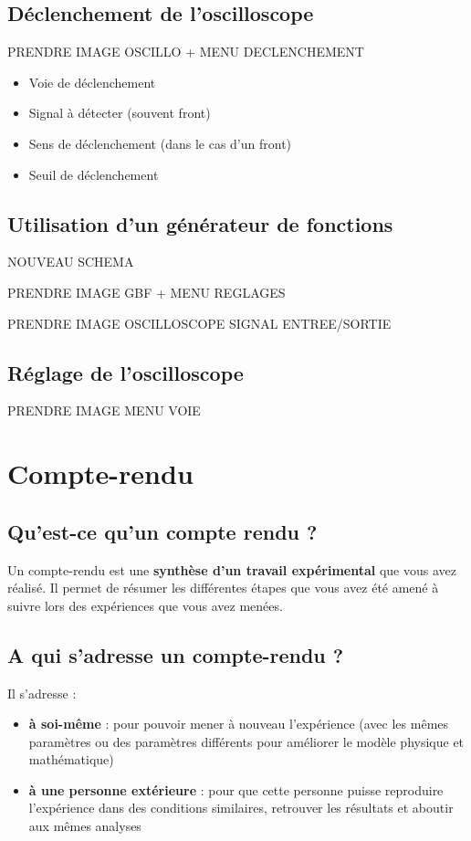 \documentclass[11pt]{article} %
\begin{document}
\subsection{Déclenchement de l'oscilloscope}

PRENDRE IMAGE OSCILLO + MENU DECLENCHEMENT

\begin{itemize}
	\item Voie de déclenchement
	\item Signal à détecter (souvent front)
	\item Sens de déclenchement (dans le cas d'un front)
	\item Seuil de déclenchement
\end{itemize}

\subsection{Utilisation d'un générateur de fonctions}

NOUVEAU SCHEMA

PRENDRE IMAGE GBF + MENU REGLAGES

PRENDRE IMAGE OSCILLOSCOPE SIGNAL ENTREE/SORTIE

\subsection{Réglage de l'oscilloscope}

PRENDRE IMAGE MENU VOIE

\section{Compte-rendu}
\subsection{Qu’est-ce qu’un compte rendu ?}
Un compte-rendu est une \textbf{synthèse d'un travail expérimental} que vous avez réalisé. Il permet de résumer les différentes étapes que vous avez été amené à suivre lors des expériences que vous avez menées.


\subsection{A qui s’adresse un compte-rendu ?}
Il s'adresse :

\begin{itemize}
	\item \textbf{à soi-même} : pour pouvoir mener à nouveau l'expérience (avec les mêmes paramètres ou des paramètres différents pour améliorer le modèle physique et mathématique)
	\item \textbf{à une personne extérieure} : pour que cette personne puisse reproduire l'expérience dans des conditions similaires, retrouver les résultats et aboutir aux mêmes analyses
\end{itemize}
\end{document}
